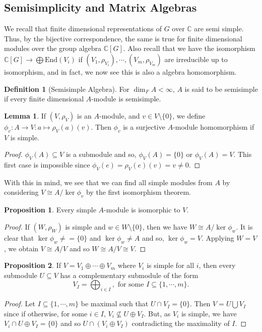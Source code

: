 \documentclass[]{article}
\theoremstyle{definition}
\theoremstyle{definition}
\newtheorem{definition}{Definition}[section]
\newtheorem{lemma}{Lemma}[section]
\newtheorem{proposition}{Proposition}[section]
\begin{document}
\subsection{Semisimplicity and Matrix Algebras}

We recall that finite dimensional representations of \(G\) over \(\mathbb{C}\) 
are semi simple. Thus, by the bijective correspondence, the same is true 
for finite dimensional modules over the group algebra \(\mathbb{C}[G]\).
Also recall that we have the isomorphism 
\(\mathbb{C}[G] \to \bigoplus \text{End}(V_i)\) if \((V_1, \rho_{V_i}), \cdots, 
(V_m, \rho_{V_m})\) are irreducible up to isomorphism, and in fact, we 
now see this is also a algebra homomorphism.

\begin{definition}[Semisimple Algebra]
  For \(\dim_F A < \infty\), \(A\) is said to be semisimple if 
  every finite dimensional \(A\)-module is semisimple.
\end{definition}

\begin{lemma}
  If \((V, \rho_V)\) is an \(A\)-module, and \(v \in V \setminus \{0\}\), we 
  define \(\phi_v : A \to V : a \mapsto \rho_V(a)(v)\). Then \(\phi_v\) is a 
  surjective \(A\)-module homomorphism if \(V\) is simple.
\end{lemma}
\begin{proof}
  \(\phi_V(A) \subseteq V\) is a submodule and so, \(\phi_V(A) = \{0\}\) or 
  \(\phi_V(A) = V\). This first case is impossible since \(\phi_V(e) = 
  \rho_V(e)(v) = v \neq 0\).
\end{proof}

With this in mind, we see that we can find all simple modules from \(A\) by 
considering \(V \cong A / \ker \phi_v\) by the first isomorphism theorem.

\begin{proposition}
  Every simple \(A\)-module is isomorphic to \(V\).
\end{proposition}
\begin{proof}
  If \((W, \rho_W)\) is simple and \(w \in W \setminus \{0\}\), then 
  we have \(W \cong A / \ker \phi_w\). It is clear that \(\ker \phi_w \neq = \{0\}\) 
  and \(\ker \phi_w \neq A\) and so, \(\ker \phi_w = V\). Applying 
  \(W = V\), we obtain \(V \cong A / V\) and so \(W \cong A / V \cong V\).
\end{proof}

\begin{proposition}
  If \(V = V_1 \oplus \cdots \oplus V_m\) where \(V_i\) is simple for all \(i\), 
  then every submodule \(U \subseteq V\) has a complementary submodule of the 
  form 
  \[V_I = \bigoplus_{i \in I}, \text{ for some } I \subseteq \{1, \cdots, m\}.\]
\end{proposition}
\begin{proof}
  Let \(I \subseteq \{1, \cdots, m\}\) be maximal such that \(U \cap V_I = \{0\}\). 
  Then \(V = U \bigcup V_I\) since if otherwise, for some \(i \in I\), 
  \(V_i \not\subseteq U \oplus V_I\). But, as \(V_i\) is simple, we have
  \(V_i \cap U \oplus V_I = \{0\}\) and so \(U \cap (V_i \oplus V_I)\) contradicting 
  the maximality of \(I\).
\end{proof}
\end{document}
